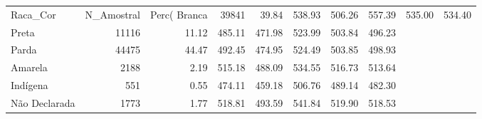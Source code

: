 \begin{tabular}{lrrrrrrr}
\toprule
Raca_Cor & N_Amostral & Perc(%
\midrule
Branca & 39841 & 39.84 & 538.93 & 506.26 & 557.39 & 535.00 & 534.40 \\
Preta & 11116 & 11.12 & 485.11 & 471.98 & 523.99 & 503.84 & 496.23 \\
Parda & 44475 & 44.47 & 492.45 & 474.95 & 524.49 & 503.85 & 498.93 \\
Amarela & 2188 & 2.19 & 515.18 & 488.09 & 534.55 & 516.73 & 513.64 \\
Indígena & 551 & 0.55 & 474.11 & 459.18 & 506.76 & 489.14 & 482.30 \\
Não Declarada & 1773 & 1.77 & 518.81 & 493.59 & 541.84 & 519.90 & 518.53 \\
\bottomrule
\end{tabular}
